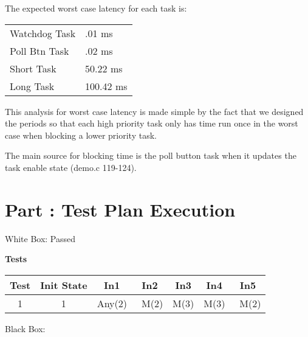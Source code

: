 \documentclass{article}
\newcounter{partNum}
\newcommand{\partNum}{%
        \stepcounter{partNum}%
        \thepartNum}
\newcommand{\sectPart}[1]{\section*{Part \partNum: #1}}
\begin{document}
The expected worst case latency for each task is:

\begin{tabular}{l | l}
Watchdog Task & .01 ms \\
Poll Btn Task & .02 ms \\
Short Task & 50.22 ms \\
Long Task & 100.42 ms \\ 
\end{tabular}

This analysis for worst case latency is made simple by the fact that we designed the periods so that each high priority task only has time run once in the worst case when blocking a lower priority task.

The main source for blocking time is the poll button task when it updates the task enable state (demo.c 119-124).


\sectPart{Test Plan Execution}

White Box: Passed

\begin{center}
    \textbf{Tests}\\
    \vspace{0.5em}
    \begin{tabular}{| c | c | c | c | c | c | c |}
        \hline
        Test & Init State & In1 & In2 & In3 & In4 & In5 \\ \hline
        1 & 1 & Any(2) & ~M(2) & M(3) & M(3) & ~M(2) \\ \hline
    \end{tabular}
\end{center}

Black Box: 
\end{document}
